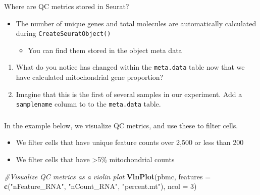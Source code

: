 \documentclass[
]{book}
\newenvironment{Shaded}{\begin{snugshade}}{\end{snugshade}}
\newcommand{\AttributeTok}[1]{\textcolor[rgb]{0.13,0.29,0.53}{#1}}
\newcommand{\CommentTok}[1]{\textcolor[rgb]{0.56,0.35,0.01}{\textit{#1}}}
\newcommand{\DecValTok}[1]{\textcolor[rgb]{0.00,0.00,0.81}{#1}}
\newcommand{\FunctionTok}[1]{\textcolor[rgb]{0.13,0.29,0.53}{\textbf{#1}}}
\newcommand{\NormalTok}[1]{#1}
\newcommand{\StringTok}[1]{\textcolor[rgb]{0.31,0.60,0.02}{#1}}
\providecommand{\tightlist}{%
  \setlength{\itemsep}{0pt}\setlength{\parskip}{0pt}}
\begin{document}
Where are QC metrics stored in Seurat?

\begin{itemize}
\tightlist
\item
  The number of unique genes and total molecules are automatically calculated during \texttt{CreateSeuratObject()}

  \begin{itemize}
  \tightlist
  \item
    You can find them stored in the object meta data
  \end{itemize}
\end{itemize}

\begin{enumerate}
\def\labelenumi{\arabic{enumi}.}
\item
  What do you notice has changed within the \texttt{meta.data} table now that we have calculated mitochondrial gene proportion?
\item
  Imagine that this is the first of
  several samples in our experiment. Add a \texttt{samplename} column to to the \texttt{meta.data} table.
\end{enumerate}

\hypertarget{section-2}{%
\subsubsection*{}\label{section-2}}

In the example below, we visualize QC metrics, and use these to filter cells.

\begin{itemize}
\tightlist
\item
  We filter cells that have unique feature counts over 2,500 or less than 200
\item
  We filter cells that have \textgreater5\% mitochondrial counts
\end{itemize}

\begin{Shaded}
\begin{Highlighting}[]
\CommentTok{\#Visualize QC metrics as a violin plot}
\FunctionTok{VlnPlot}\NormalTok{(pbmc, }\AttributeTok{features =} \FunctionTok{c}\NormalTok{(}\StringTok{"nFeature\_RNA"}\NormalTok{, }\StringTok{"nCount\_RNA"}\NormalTok{, }\StringTok{"percent.mt"}\NormalTok{), }\AttributeTok{ncol =} \DecValTok{3}\NormalTok{)}
\end{Highlighting}
\end{Shaded}
\end{document}
